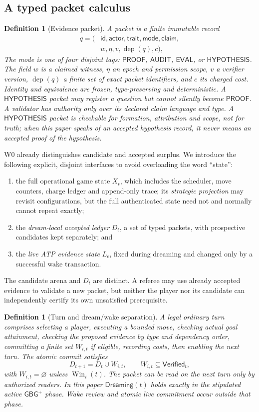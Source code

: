 \documentclass[11pt,letterpaper]{article}
\newtheorem{definition}[theorem]{Definition}
\newcommand{\Pk}{\mathsf{PROOF}}
\newcommand{\Au}{\mathsf{AUDIT}}
\newcommand{\Ev}{\mathsf{EVAL}}
\newcommand{\Hy}{\mathsf{HYPOTHESIS}}
\newcommand{\Win}{\operatorname{Win}}
\newcommand{\dep}{\operatorname{dep}}
\newcommand{\GBGgame}{\mathsf{GBG}^{+}}
\begin{document}
\subsection{A typed packet calculus}
\begin{definition}[Evidence packet]
A packet is a finite immutable record
\[
\begin{aligned}
q=(&\mathsf{id},\mathsf{actor},\mathsf{trait},\mathsf{mode},\mathsf{claim},\\
   &w,\eta,v,\dep(q),c),
\end{aligned}
\]
The mode is one of four disjoint tags: $\Pk$, $\Au$, $\Ev$, or $\Hy$. The field $w$ is a claimed witness, $\eta$ an epoch and permission scope, $v$ a verifier version, $\dep(q)$ a finite set of exact packet identifiers, and $c$ its charged cost. Identity and equivalence are frozen, type-preserving and deterministic. A $\Hy$ packet may register a question but cannot silently become $\Pk$. A validator has authority only over its declared claim language and type. A $\Hy$ packet is checkable for formation, attribution and scope, \emph{not} for truth; when this paper speaks of an accepted hypothesis record, it never means an accepted proof of the hypothesis.
\end{definition}
W0 already distinguishes candidate and accepted surplus. We introduce the following explicit, disjoint interfaces to avoid overloading the word ``state'':
\begin{enumerate}[label=(\roman*)]
\item the full operational game state $X_t$, which includes the scheduler, move counters, charge ledger and append-only trace; its \emph{strategic projection} may revisit configurations, but the full authenticated state need not and normally cannot repeat exactly;
\item the \emph{dream-local accepted ledger} $D_t$, a set of typed packets, with prospective candidates kept separately; and
\item the \emph{live ATP evidence state} $L_e$, fixed during dreaming and changed only by a successful wake transaction.
\end{enumerate}
The candidate arena and $D_t$ are distinct. A referee may use already accepted evidence to validate a new packet, but neither the player nor its candidate can independently certify its own unsatisfied prerequisite.

\begin{definition}[Turn and dream/wake separation]
A legal ordinary turn comprises selecting a player, executing a bounded move, checking actual goal attainment, checking the proposed evidence by type and dependency order, committing a finite set $W_{i,t}$ if eligible, recording costs, then enabling the next turn. The atomic commit satisfies
\[
D_{t+1}=D_t\cup W_{i,t},\qquad W_{i,t}\subseteq\mathsf{Verified}_t,
\tag{T}\label{eq:T}
\]
with $W_{i,t}=\varnothing$ unless $\Win_i(t)$. The packet can be read on the next turn only by authorized readers. In this paper $\mathsf{Dreaming}(t)$ holds exactly in the stipulated active $\GBGgame$ phase. Wake review and atomic live commitment occur outside that phase.
\end{definition}
\end{document}
